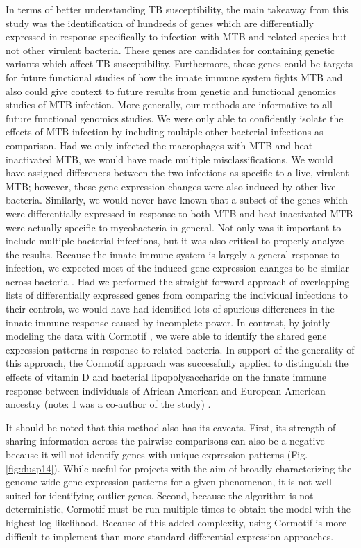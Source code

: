 In terms of better understanding TB susceptibility, the main takeaway
from this study was the identification of hundreds of genes which are
differentially expressed in response specifically to infection with
MTB and related species but not other virulent bacteria. These genes
are candidates for containing genetic variants which affect TB
susceptibility. Furthermore, these genes could be targets for future
functional studies of how the innate immune system fights MTB and also
could give context to future results from genetic and functional
genomics studies of MTB infection. More generally, our methods are
informative to all future functional genomics studies. We were only
able to confidently isolate the effects of MTB infection by including
multiple other bacterial infections as comparison. Had we only
infected the macrophages with MTB and heat-inactivated MTB, we would
have made multiple misclassifications. We would have assigned
differences between the two infections as specific to a live, virulent
MTB; however, these gene expression changes were also induced by other
live bacteria. Similarly, we would never have known that a subset of
the genes which were differentially expressed in response to both MTB
and heat-inactivated MTB were actually specific to mycobacteria in
general. Not only was it important to include multiple bacterial
infections, but it was also critical to properly analyze the
results. Because the innate immune system is largely a general
response to infection, we expected most of the induced gene expression
changes to be similar across bacteria \citep{Huang2001, Boldrick2002,
  Nau2002, Jenner2005}.  Had we performed the straight-forward
approach of overlapping lists of differentially expressed genes from
comparing the individual infections to their controls, we would have
had identified lots of spurious differences in the innate immune
response caused by incomplete power. In contrast, by jointly modeling
the data with Cormotif \citep{Wei2015}, we were able to identify the
shared gene expression patterns in response to related bacteria. In
support of the generality of this approach, the Cormotif approach was
successfully applied to distinguish the effects of vitamin D and
bacterial lipopolysaccharide on the innate immune response between
individuals of African-American and European-American ancestry (note:
I was a co-author of the study) \citep{Kariuki2016}.

It should be noted that this method also has its caveats. First, its
strength of sharing information across the pairwise comparisons can
also be a negative because it will not identify genes with unique
expression patterns (Fig. \ref{fig:dusp14}). While useful for projects
with the aim of broadly characterizing the genome-wide gene expression
patterns for a given phenomenon, it is not well-suited for identifying
outlier genes. Second, because the algorithm is not deterministic,
Cormotif must be run multiple times to obtain the model with the
highest log likelihood. Because of this added complexity, using
Cormotif is more difficult to implement than more standard
differential expression approaches.


